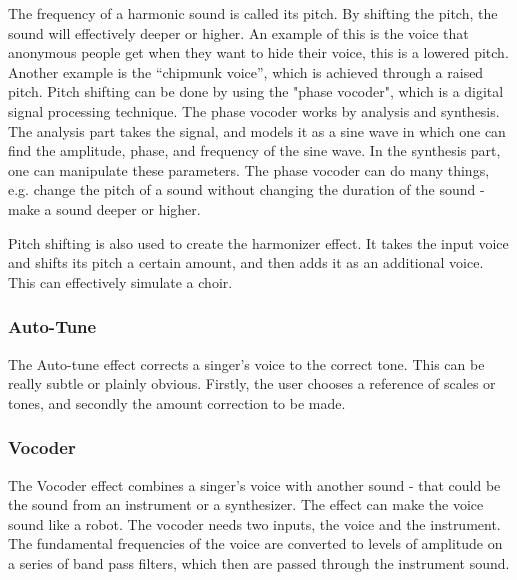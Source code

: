 The frequency of a harmonic sound is called its pitch\citep{Katjaas_00}. By shifting the pitch, the sound will effectively deeper or higher. An example of this is the voice that anonymous people get when they want to hide their voice, this is a lowered pitch. Another example is the “chipmunk voice”, which is achieved through a raised pitch.
Pitch shifting can be done by using the "phase vocoder", which is a digital signal processing technique\citep{dolson}. The phase vocoder works by analysis and synthesis. The analysis part takes the signal, and models it as a sine wave in which one can find the amplitude, phase, and frequency of the sine wave. In the synthesis part, one can manipulate these parameters. 
The phase vocoder can do many things, e.g. change the pitch of a sound without changing the duration of the sound - make a sound deeper or higher. 



Pitch shifting is also used to create the harmonizer effect. It takes the input voice and shifts its pitch a certain amount, and then adds it as an additional voice. This can effectively simulate a choir.

\subsubsection{Auto-Tune}

The Auto-tune effect corrects a singer's voice to the correct tone\citep{Hadhazy_2010}. This can be really subtle or plainly obvious. Firstly, the user chooses a reference of scales or tones, and secondly the amount correction to be made.

\subsubsection{Vocoder}

The Vocoder effect combines a singer's voice with another sound - that could be the sound from an instrument or a synthesizer\citep{Vocoder_00}. 
The effect can make the voice sound like a robot. The vocoder needs two inputs, the voice and the instrument. The fundamental frequencies of the voice are converted to levels of amplitude on a series of band pass filters, which then are passed through the instrument sound.


